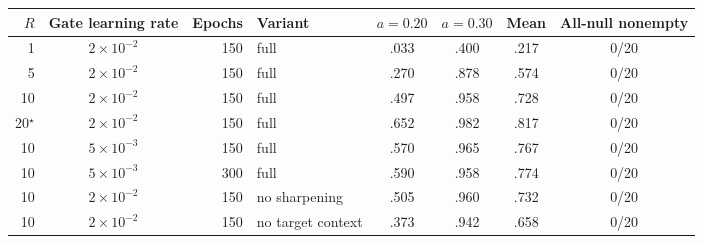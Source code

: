 \begin{tabular}{rcrlcccc}
\toprule
$R$ & Gate learning rate & Epochs & Variant & $a=0.20$ & $a=0.30$ & Mean & All-null nonempty\\
\midrule
1 & $2\times10^{-2}$ & 150 & full & .033 & .400 & .217 & 0/20\\
5 & $2\times10^{-2}$ & 150 & full & .270 & .878 & .574 & 0/20\\
10 & $2\times10^{-2}$ & 150 & full & .497 & .958 & .728 & 0/20\\
20$^\star$ & $2\times10^{-2}$ & 150 & full & .652 & .982 & .817 & 0/20\\
10 & $5\times10^{-3}$ & 150 & full & .570 & .965 & .767 & 0/20\\
10 & $5\times10^{-3}$ & 300 & full & .590 & .958 & .774 & 0/20\\
10 & $2\times10^{-2}$ & 150 & no sharpening & .505 & .960 & .732 & 0/20\\
10 & $2\times10^{-2}$ & 150 & no target context & .373 & .942 & .658 & 0/20\\
\bottomrule
\end{tabular}
